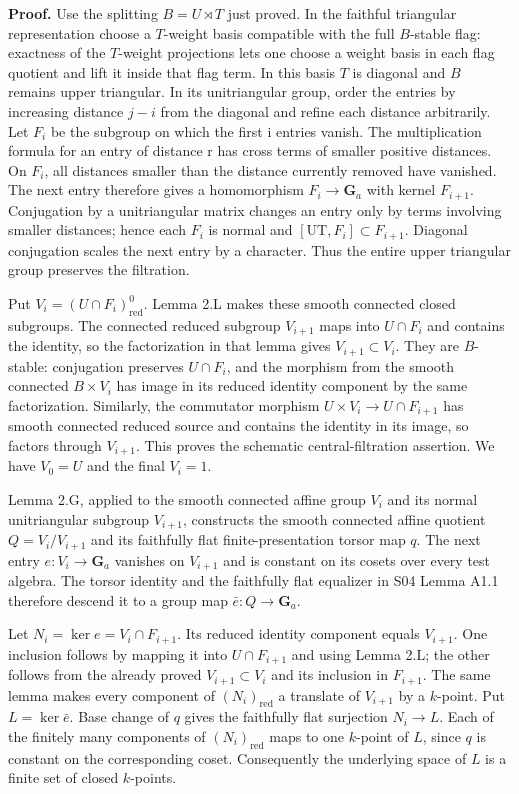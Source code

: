\documentclass[11pt,a4paper,openany]{report}
\begin{document}
\textbf{Proof.} Use the splitting \(B=U\rtimes T\) just proved. In the faithful triangular representation choose a \(T\)-weight basis compatible with the full \(B\)-stable flag: exactness of the \(T\)-weight projections lets one choose a weight basis in each flag quotient and lift it inside that flag term. In this basis \(T\) is diagonal and \(B\) remains upper triangular. In its unitriangular group, order the entries by increasing distance \(j-i\) from the diagonal and refine each distance arbitrarily. Let \(F_i\) be the subgroup on which the first i entries vanish. The multiplication formula for an entry of distance r has cross terms of smaller positive distances. On \(F_i\), all distances smaller than the distance currently removed have vanished. The next entry therefore gives a homomorphism \(F_i\to\mathbf G_a\) with kernel \(F_{i+1}\). Conjugation by a unitriangular matrix changes an entry only by terms involving smaller distances; hence each \(F_i\) is normal and \([\mathrm{UT},F_i]\subset F_{i+1}\). Diagonal conjugation scales the next entry by a character. Thus the entire upper triangular group preserves the filtration.

Put \(V_i=(U\cap F_i)^0_{\mathrm{red}}\). Lemma 2.L makes these smooth connected closed subgroups. The connected reduced subgroup \(V_{i+1}\) maps into \(U\cap F_i\) and contains the identity, so the factorization in that lemma gives \(V_{i+1}\subset V_i\). They are \(B\)-stable: conjugation preserves \(U\cap F_i\), and the morphism from the smooth connected \(B\times V_i\) has image in its reduced identity component by the same factorization. Similarly, the commutator morphism \(U\times V_i\to U\cap F_{i+1}\) has smooth connected reduced source and contains the identity in its image, so factors through \(V_{i+1}\). This proves the schematic central-filtration assertion. We have \(V_0=U\) and the final \(V_i=1\).

Lemma 2.G, applied to the smooth connected affine group \(V_i\) and its normal unitriangular subgroup \(V_{i+1}\), constructs the smooth connected affine quotient \(Q=V_i/V_{i+1}\) and its faithfully flat finite-presentation torsor map \(q\). The next entry \(e:V_i\to\mathbf G_a\) vanishes on \(V_{i+1}\) and is constant on its cosets over every test algebra. The torsor identity and the faithfully flat equalizer in S04 Lemma A1.1 therefore descend it to a group map \(\bar e:Q\to\mathbf G_a\).

Let \(N_i=\ker e=V_i\cap F_{i+1}\). Its reduced identity component equals \(V_{i+1}\). One inclusion follows by mapping it into \(U\cap F_{i+1}\) and using Lemma 2.L; the other follows from the already proved \(V_{i+1}\subset V_i\) and its inclusion in \(F_{i+1}\). The same lemma makes every component of \((N_i)_{\mathrm{red}}\) a translate of \(V_{i+1}\) by a \(k\)-point. Put \(L=\ker\bar e\). Base change of \(q\) gives the faithfully flat surjection \(N_i\to L\). Each of the finitely many components of \((N_i)_{\mathrm{red}}\) maps to one \(k\)-point of \(L\), since \(q\) is constant on the corresponding coset. Consequently the underlying space of \(L\) is a finite set of closed \(k\)-points.
\end{document}
